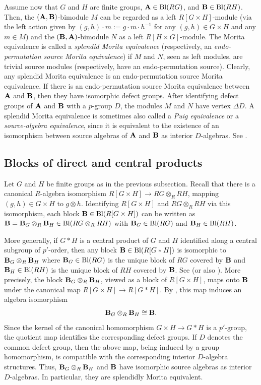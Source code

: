 \par
Assume now that $G$ and $H$ are finite groups, ${\mathbf{A}}\in\operatorname{Bl}(RG)$, and ${\mathbf{B}}\in\operatorname{Bl}(RH)$. Then, the $({\mathbf{A}},{\mathbf{B}})$-bimodule $M$ can be regarded as a left $R[G\times H]$-module (via the left action given by $(g,h)\cdot m:=g\cdot m\cdot h^{-1}$ for any $(g,h)\in G\times H$ and any $m\in M$) and the $({\mathbf{B}},{\mathbf{A}})$-bimodule $N$ as a left $R[H\times G]$-module. The Morita equivalence is called a \emph{splendid Morita equivalence} (respectively, an \emph{endo-permutation source Morita equivalence}) if $M$ and $N$, seen as left modules, are trivial source modules (respectively, have an endo-permutation source). Clearly, any splendid Morita equivalence is an endo-permutation source  Morita equivalence. If there is an endo-permutation source Morita equivalence between ${\mathbf{A}}$ and ${\mathbf{B}}$, then they  have isomorphic defect groups. After identifying defect groups of ${\mathbf{A}}$ and ${\mathbf{B}}$ with a $p$-group $D$, the modules $M$ and $N$ have vertex $\Delta D$. A splendid Morita equivalence is sometimes also called a \emph{Puig equivalence} or a \emph{source-algebra equivalence}, since it is equivalent to the existence of an isomorphism between source algebras of ${\mathbf{A}}$ and ${\mathbf{B}}$ as interior $D$-algebras. See \cite[Proposition~9.7.1, Remark~9.7.2, Definition~9.7.3,  Theorem~9.7.4 and Theorem 9.11.2]{LinckelmannVol2}.
\vspace{2mm}
\subsection{Blocks of direct and central products}\label{ssec:blocks_of_central_producrs}
Let $G$ and $H$ be finite groups as in the previous subsection. 
Recall that there is a canonical $R$-algebra isomorphism $R[G\times H]\longrightarrow RG\otimes_R RH$, mapping $(g,h)\in G\times H$ to $g\otimes h$. Identifying $R[G\times H]$ and $RG\otimes_R RH$ via this isomorphism, each block ${\mathbf{B}} \in\operatorname{Bl}(R[G\times H])$ can be written as ${\mathbf{B}}={\mathbf{B}}_G\otimes_R{\mathbf{B}}_H\in \operatorname{Bl}(RG\otimes_R RH)$ with ${\mathbf{B}}_G\in\operatorname{Bl}(RG)$ and ${\mathbf{B}}_H\in\operatorname{Bl}(RH)$. 
\par
More generally, if $G\ast H$ is a central product of $G$ and $H$ identified along a central subgroup of $p'$-order, then any block ${\mathbf{B}} \in\operatorname{Bl}(R[G\ast H])$ is isomorphic to ${\mathbf{B}}_G\otimes_R{\mathbf{B}}_H$ where ${\mathbf{B}}_G\in\operatorname{Bl}(RG)$ is the unique block of $RG$ covered by ${\mathbf{B}}$ and ${\mathbf{B}}_H\in\operatorname{Bl}(RH)$ is the unique block of $RH$ covered by ${\mathbf{B}}$. See \cite[Proposition~1.5]{Duvel04} (or also \cite[Lemma~7.5]{Sambale14}). More precisely, the block ${\mathbf{B}}_G\otimes_R{\mathbf{B}}_H$, viewed as a block of \(R[G\times H]\), maps onto ${\mathbf{B}}$ under the canonical map $R[G\times H]\to R[G\ast H]$. By
\cite[Lemma~1.4]{Duvel04}, this map induces an algebra isomorphism
\[
        {\mathbf{B}}_G\otimes_R{\mathbf{B}}_H\cong {\mathbf{B}}.
\]
Since the kernel of the canonical homomorphism $G\times H\to G\ast H$ is a $p'$-group, the quotient map identifies the corresponding defect groups. If $D$ denotes the common defect group, then the above map, being induced by a group homomorphism, is compatible with the corresponding interior $D$-algebra structures. Thus, ${\mathbf{B}}_G\otimes_R{\mathbf{B}}_H$ and ${\mathbf{B}}$ have isomorphic source algebras as interior $D$-algebras. In particular, they are splendidly Morita equivalent. 



